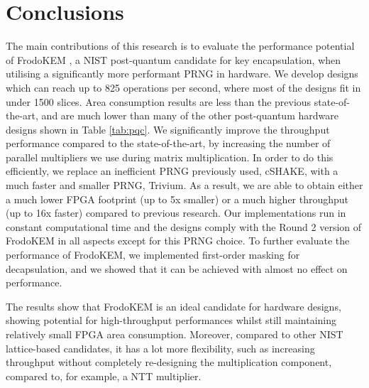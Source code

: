 \vspace{-0.2cm}
\section{Conclusions}\label{sec:conclusions}

The main contributions of this research is to evaluate the performance potential of FrodoKEM \cite{frodokem}, a NIST post-quantum candidate for key encapsulation, when utilising a significantly more performant PRNG in hardware. We develop designs which can reach up to 825 operations per second, where most of the designs fit in under 1500 slices. Area consumption results are less than the previous state-of-the-art, and are much lower than many of the other post-quantum hardware designs shown in Table \ref{tab:pqc}. We significantly improve the throughput performance compared to the state-of-the-art, by increasing the number of parallel multipliers we use during matrix multiplication. In order to do this efficiently, we replace an inefficient PRNG previously used, cSHAKE, with a much faster and smaller PRNG, Trivium. As a result, we are able to obtain either a much lower FPGA footprint (up to 5x smaller) or a much higher throughput (up to 16x faster) compared to previous research. Our implementations run in constant computational time and the designs comply with the Round 2 version of FrodoKEM in all aspects except for this PRNG choice. To further evaluate the performance of FrodoKEM, we implemented first-order masking for decapsulation, and we showed that it can be achieved with almost no effect on performance.

The results show that FrodoKEM is an ideal candidate for hardware designs, showing potential for high-throughput performances whilst still maintaining relatively small FPGA area consumption. Moreover, compared to other NIST lattice-based candidates, it has a lot more flexibility, such as increasing throughput without completely re-designing the multiplication component, compared to, for example, a NTT multiplier.
